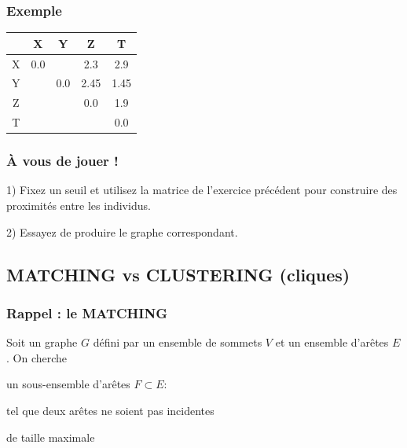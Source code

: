 \documentclass[11pt]{beamer}
\newenvironment{slide}[1]{%
\begin{frame}[environment=slide]
\frametitle{#1}
}{%
\end{frame}
}
\begin{document}
\begin{slide}{Exemple}

\begin{tabular}{|c|c|c|c|c|}
\hline
& X & Y & Z & T \\ \hline
X &\cellcolor{black!20} \color{black!20} 0.0&\cellcolor{red!50}{1.45}&2.3&2.9 \\ \hline
Y &&\cellcolor{black!20} \color{black!20} 0.0&2.45&\cellcolor{red!50}1.45 \\ \hline
Z &&&\cellcolor{black!20} \color{black!20} 0.0&\cellcolor{red!50}1.9 \\ \hline
T &&&&\cellcolor{black!20} \color{black!20} 0.0 \\ \hline
\end{tabular}

\end{slide}


\begin{slide}{{\`A} vous de jouer !}

1) Fixez un seuil et utilisez la matrice de l'exercice précédent pour construire des proximités entre les individus. \\

\vspace{0.3cm}

2) Essayez de produire le graphe correspondant.

\end{slide}

\subsection{MATCHING vs CLUSTERING (cliques)}

\begin{slide}{Rappel : le MATCHING}
Soit un graphe $G$ défini par un ensemble de sommets $V$ et un ensemble d'arêtes $E$. On cherche 

\vspace{0.5cm}

\pause

un sous-ensemble d'arêtes $F \subset E$:

\vspace{0.5cm}

\pause

tel que deux arêtes ne soient pas incidentes

\vspace{0.5cm}

\pause

de taille maximale

\end{slide}
\end{document}
